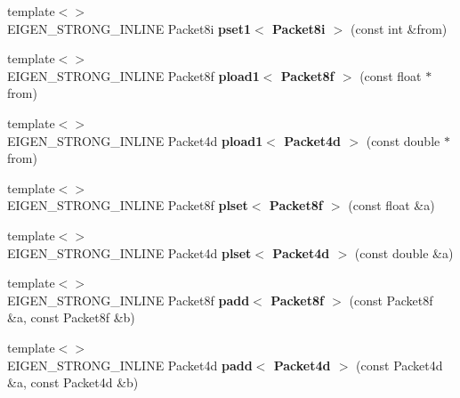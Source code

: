 \begin{DoxyCompactItemize}
{\footnotesize template$<$$>$ }\\E\+I\+G\+E\+N\+\_\+\+S\+T\+R\+O\+N\+G\+\_\+\+I\+N\+L\+I\+NE Packet8i {\bfseries pset1$<$ Packet8i $>$} (const int \&from)
\item 
\mbox{\label{namespace_eigen_1_1internal_ad29565e3fc4b10765b509bb0724f8c3c}} 
{\footnotesize template$<$$>$ }\\E\+I\+G\+E\+N\+\_\+\+S\+T\+R\+O\+N\+G\+\_\+\+I\+N\+L\+I\+NE Packet8f {\bfseries pload1$<$ Packet8f $>$} (const float $\ast$from)
\item 
\mbox{\label{namespace_eigen_1_1internal_af12588dc60a85e8132a95622e31cef8e}} 
{\footnotesize template$<$$>$ }\\E\+I\+G\+E\+N\+\_\+\+S\+T\+R\+O\+N\+G\+\_\+\+I\+N\+L\+I\+NE Packet4d {\bfseries pload1$<$ Packet4d $>$} (const double $\ast$from)
\item 
\mbox{\label{namespace_eigen_1_1internal_a6e4f5eb512758eb36335295f73ef7a5b}} 
{\footnotesize template$<$$>$ }\\E\+I\+G\+E\+N\+\_\+\+S\+T\+R\+O\+N\+G\+\_\+\+I\+N\+L\+I\+NE Packet8f {\bfseries plset$<$ Packet8f $>$} (const float \&a)
\item 
\mbox{\label{namespace_eigen_1_1internal_ab09c0ba6a7b1bb4257c766f1a716af2e}} 
{\footnotesize template$<$$>$ }\\E\+I\+G\+E\+N\+\_\+\+S\+T\+R\+O\+N\+G\+\_\+\+I\+N\+L\+I\+NE Packet4d {\bfseries plset$<$ Packet4d $>$} (const double \&a)
\item 
\mbox{\label{namespace_eigen_1_1internal_a52aceed024c19abe6373e983f1cf456f}} 
{\footnotesize template$<$$>$ }\\E\+I\+G\+E\+N\+\_\+\+S\+T\+R\+O\+N\+G\+\_\+\+I\+N\+L\+I\+NE Packet8f {\bfseries padd$<$ Packet8f $>$} (const Packet8f \&a, const Packet8f \&b)
\item 
\mbox{\label{namespace_eigen_1_1internal_add351895f6c430f9868527306613ba88}} 
{\footnotesize template$<$$>$ }\\E\+I\+G\+E\+N\+\_\+\+S\+T\+R\+O\+N\+G\+\_\+\+I\+N\+L\+I\+NE Packet4d {\bfseries padd$<$ Packet4d $>$} (const Packet4d \&a, const Packet4d \&b)

\end{DoxyCompactItemize}
